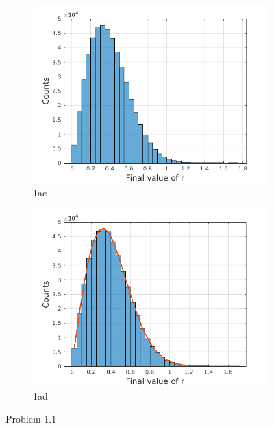 \documentclass[a4paper]{article}
\begin{document}
\begin{figure}
			\begin{subfigure} {.5\columnwidth}
				\includegraphics[width=\columnwidth]{../plots/1ac_hist_randomwalk.png}
				\caption{1ac}
				\label{fig:1ac}
			\end{subfigure}%
			\hfill
			\begin{subfigure} {.5\columnwidth}
				\includegraphics[width=\columnwidth]{../plots/1ad_hist_randomwalk.png}
				\caption{1ad}
				\label{fig:1ad}
			\end{subfigure}
			\caption{Problem 1.1}
			\label{fig:1}
		\end{figure}
		
		
		
\end{document}
